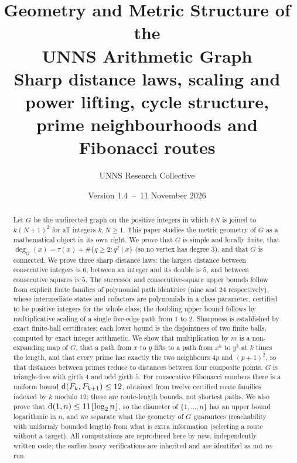 \title{\textbf{Geometry and Metric Structure of the\\ UNNS Arithmetic Graph}\\[6pt]
\large Sharp distance laws, scaling and power lifting, cycle structure, prime neighbourhoods and Fibonacci routes}
\author{UNNS Research Collective}
\date{Version 1.4 \,--\, 11 November 2026}


\maketitle

\begin{abstract}
\noindent
Let $G$ be the undirected graph on the positive integers in which $kN$ is joined to $k(N+1)^2$ for all integers $k,N\ge1$.
This paper studies the metric geometry of $G$ as a mathematical object in its own right.
We prove that $G$ is simple and locally finite, that $\deg_G(x)=\tau(x)+\#\{q\ge2:q^2\mid x\}$ (so no vertex has degree $3$), and that $G$ is connected.
We prove three sharp distance laws: the largest distance between consecutive integers is $6$, between an integer and its double is $5$, and between consecutive squares is $5$.
The successor and consecutive-square upper bounds follow from explicit finite families of polynomial path identities (nine and $24$ respectively), whose intermediate states and cofactors are polynomials in a class parameter, certified to be positive integers for the whole class; the doubling upper bound follows by multiplicative scaling of a single five-edge path from $1$ to $2$. Sharpness is established by exact finite-ball certificates: each lower bound is the disjointness of two finite balls, computed by exact integer arithmetic.
We show that multiplication by $m$ is a non-expanding map of $G$, that a path from $x$ to $y$ lifts to a path from $x^k$ to $y^k$ at $k$ times the length, and that every prime has exactly the two neighbours $4p$ and $(p+1)^2$, so that distances between primes reduce to distances between four composite points.
$G$ is triangle-free with girth $4$ and odd girth $5$.
For consecutive Fibonacci numbers there is a uniform bound $\operatorname{d}(F_k,F_{k+1})\le12$, obtained from twelve certified route families indexed by $k$ modulo $12$; these are route-length bounds, not shortest paths.
We also prove that $\operatorname{d}(1,n)\le11\lfloor\log_2n\rfloor$, so the diameter of $\{1,\dots,n\}$ has an upper bound logarithmic in $n$, and we separate what the geometry of $G$ guarantees (reachability with uniformly bounded length) from what is extra information (selecting a route without a target).
All computations are reproduced here by new, independently written code; the earlier heavy verifications are inherited and are identified as not re-run.
\end{abstract}

